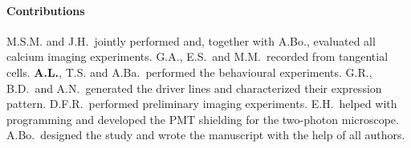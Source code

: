 \paragraph{Contributions}
M.S.M. and J.H.\ jointly performed and, together with A.Bo., evaluated all calcium imaging experiments. G.A., E.S.\ and M.M.\ recorded from tangential cells. \textbf{A.L.}, T.S. and A.Ba.\ performed the behavioural experiments. G.R., B.D.\ and A.N.\ generated the driver lines and characterized their expression pattern. D.F.R.\ performed preliminary imaging experiments. E.H.\ helped with programming and developed the PMT shielding for the two-photon microscope. A.Bo.\ designed the study and wrote the manuscript with the help of all authors.

\cleardoublepage


